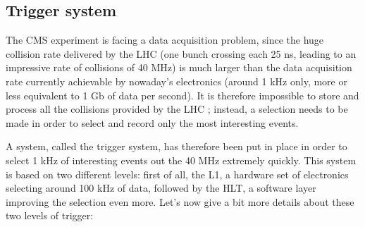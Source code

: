\documentclass[a4paper, 10pt, openright]{report}
\begin{document}
\subsection{Trigger system} \label{subsection:Trigger}

The \ac{CMS} experiment is facing a data acquisition problem, since the huge collision rate delivered by the \ac{LHC} (one bunch crossing each 25 ns, leading to an impressive rate of collisions of 40 MHz) is much larger than the data acquisition rate currently achievable by nowaday's electronics (around 1 kHz only, more or less equivalent to 1 Gb of data per second). It is therefore impossible to store and process all the collisions provided by the \ac{LHC} ; instead, a selection needs to be made in order to select and record only the most interesting events.

A system, called the trigger system, has therefore been put in place in order to select 1 kHz of interesting events out the 40 MHz extremely quickly. This system is based on two different levels: first of all, the \ac{L1}, a hardware set of electronics selecting around 100 kHz of data, followed by the \ac{HLT}, a software layer improving the selection even more. Let's now give a bit more details about these two levels of trigger:
\end{document}
